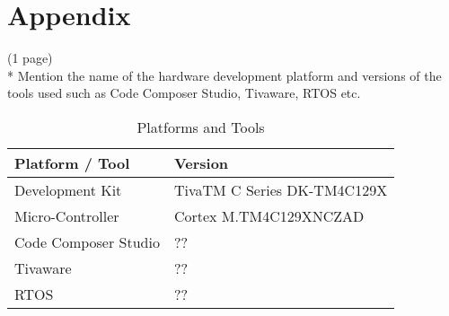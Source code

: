 \chapter{Appendix}

(1 page)\\
* Mention the name of the hardware development platform and versions of the tools used such as Code Composer Studio, Tivaware, RTOS etc.

\begin{table}[H]
	\begin{tabularx}{\textwidth}{l | X}
		Platform / Tool & Version \\
		\hline
		Development Kit & TivaTM C Series DK-TM4C129X\\
		\hline
		Micro-Controller & Cortex M.TM4C129XNCZAD\\
		\hline
		Code Composer Studio & ??\\
		\hline
		Tivaware & ??\\
		\hline
		RTOS & ??\\
	\end{tabularx}
	\caption{Platforms and Tools}
	\label{tab:PlatformsAndTools}
\end{table}